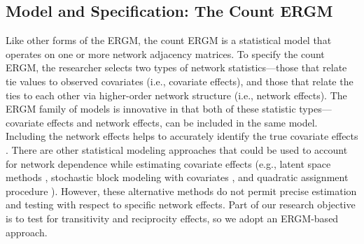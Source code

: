 \documentclass[reqno,onecolumn,letterpaper,12pt]{article}
\begin{document}
\subsection{Model and Specification: The Count ERGM}

Like other forms of the ERGM, the count ERGM is a statistical model that operates on one or more network adjacency matrices. To specify the count ERGM, the researcher selects two types of network statistics---those that relate tie values to observed covariates (i.e., covariate effects), and those that relate the ties to each other via higher-order network structure (i.e., network effects). The ERGM family of models is innovative in that both of these statistic types---covariate effects and network effects, can be included in the same model. Including the network effects helps to accurately identify the true covariate effects \citep{metz2018interdependent}. There are other statistical modeling approaches that could be used to account for network dependence while estimating covariate effects (e.g., latent space methods \citep{matias2014modeling}, stochastic block modeling with covariates \citep{sweet2015incorporating}, and quadratic assignment procedure \citep{robins2012statistical}). However, these alternative methods do not permit precise estimation and testing with respect to specific network effects. Part of our research objective is to test for transitivity and reciprocity effects, so we adopt an ERGM-based approach.
\end{document}
